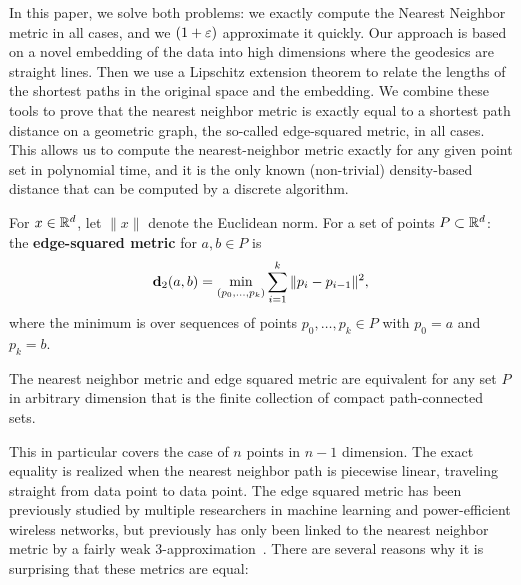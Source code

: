 In this paper, we solve both problems: we exactly compute the Nearest
Neighbor metric in all cases, and we $(1+\varepsilon)$ approximate it quickly.
Our approach is based on a novel embedding of the data into high dimensions where the geodesics are straight lines.
Then we use a Lipschitz extension theorem to relate the lengths of the shortest paths in the original space and the embedding.
We combine these tools to prove that the nearest neighbor metric is exactly equal to a shortest path distance on a geometric graph, the so-called edge-squared metric, in all cases.
This allows us to compute the nearest-neighbor metric exactly for any given point set in polynomial time, and it is the only known (non-trivial) density-based distance that can be computed by a discrete algorithm.

  \begin{definition}
For $x\in \mathbb{R}^d$, let $\|x\|$ denote the Euclidean norm.
  For a set of points $P\subset \mathbb{R}^d$: 
  the \textbf{edge-squared metric} for $a,b\in P$ is
  \[
    \mathbf{d}_2(a,b) = \min_{(p_0,\ldots, p_k)}\sum_{i=1}^k \|p_i - p_{i-1}\|^2,
  \]
  where the minimum is over sequences of points $p_0,\ldots, p_k\in P$ with $p_0 = a$ and $p_k = b$.
  \end{definition}

\begin{theorem}\label{thm:NN} The nearest neighbor metric and edge squared
metric are equivalent for any set $P$ in arbitrary dimension that is the
finite collection of compact path-connected sets.
\end{theorem}

This in particular covers the case of $n$ points in $n-1$ dimension. The exact equality is realized when the nearest neighbor path is piecewise
linear, traveling straight from data point to data point.
The edge squared metric has been previously studied by multiple researchers
in machine learning and power-efficient wireless networks, but previously
has only been linked to the nearest neighbor metric by a fairly weak
3-approximation~\cite{cohen15approximating}.
There are several reasons why it is surprising that these metrics are equal:

